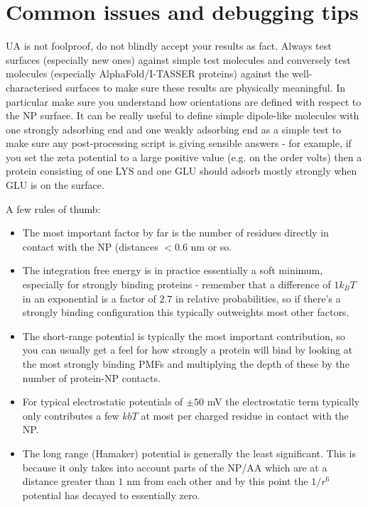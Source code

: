 \documentclass[10pt,a4paper,onecolumn]{report}
\begin{document}
 


\section{Common issues and debugging tips}
UA is not foolproof, do not blindly accept your results as fact. Always test surfaces (especially new ones) against simple test molecules and conversely test molecules (especially AlphaFold/I-TASSER proteins) against the well-characterised surfaces to make sure these results are physically meaningful. In particular make sure you understand how orientations are defined with respect to the NP surface. It can be really useful to define simple dipole-like molecules with one strongly adsorbing end and one weakly adsorbing end as a simple test to make sure any post-processing script is giving sensible answers - for example, if you set the zeta potential to a large positive value (e.g. on the order volts) then a protein consisting of one LYS and one GLU should adsorb mostly strongly when GLU is on the surface.

A few rules of thumb:

\begin{itemize}
\item The most important factor by far is the number of residues directly in contact with the NP (distances $< 0.6 $ nm or so. 
\item The integration free energy is in practice essentially a soft minimum, especially for strongly binding proteins - remember that a difference of $1 k_BT$ in an exponential is a factor of $2.7$ in relative probabilities, so if there's a strongly binding configuration this typically outweights most other factors.
\item The short-range potential is typically the most important contribution, so you can usually get a feel for how strongly a protein will bind by looking at the most strongly binding PMFs and multiplying the depth of these by the number of protein-NP contacts. 
\item For typical electrostatic potentials of $\pm 50$ mV the electrostatic term typically only contributes a few $kbT$ at most per charged residue in contact with the NP. 
\item The long range (Hamaker) potential is generally the least significant. This is because it only takes into account parts of the NP/AA which are at a distance greater than $1$ nm from each other and by this point the $1/r^6$ potential has decayed to essentially zero. 
\end{itemize}
\end{document}

